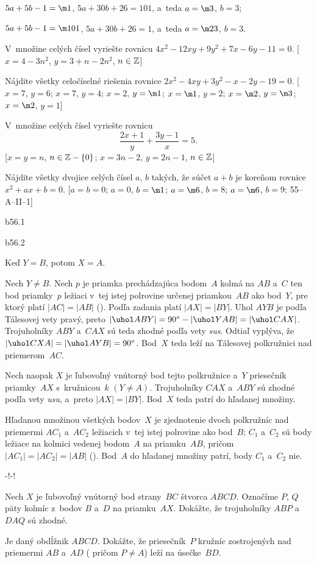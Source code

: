 {$5a+5b-1=\m1$, $5a+30b+26=101$, a~teda $a=\m3$, $b=3$;

$5a+5b-1=\m101$, $5a+30b+26=1$, a~teda $a=\m23$, $b=3$.

V~množine celých čísel vyriešte rovnicu $4x^2-12xy+9y^2+7x-6y-11=0$.
[$x=4-3n^2$, $y=3+n-2n^2$, $n\in\Bbb Z$]

Nájdite všetky celočíselné riešenia rovnice $2x^2-4xy+3y^2-x-2y-19=0$.
[$x=7$, $y=6$; $x=7$, $y=4$; $x=2$, $y=\m1$;  $x=\m1$, $y=2$; $x=\m2$, $y=\m3$; $x=\m2$, $y=1$]

V~množine celých čísel vyriešte rovnicu
$$
\frac {2x+1}y+\frac{3y-1}x=5.
$$
[$x=y=n$, $n\in\Bbb Z-\{0\}$; $x=3n-2$, $y=2n-1$, $n\in\Bbb Z$]

Nájdite všetky dvojice celých čísel $a$, $b$ takých, že súčet $a+b$ je koreňom rovnice $x^2+ax+b=0$.
[$a=b=0$; $a=0$, $b=\m1$; $a=\m6$, $b=8$; $a=\m6$, $b=9$; 55--A--II--1]

}

{%
\epsplace b56.1 \hfil\Obr \par
\epsplace b56.2 \hfil\Obr

Keď $Y=B$, potom $X=A$. 

Nech $Y\ne B$. Nech $p$ je priamka prechádzajúca bodom~$A$ kolmá na $AB$ a~$C$ ten bod priamky~$p$ ležiaci v~tej istej polrovine určenej priamkou~$AB$ ako bod~$Y$, pre ktorý platí $|AC|=|AB|$ (\obr). Podľa zadania platí $|AX|=|BY|$. Uhol $AYB$ je podľa Tálesovej vety pravý, preto $|\uhol ABY|=90^\circ -|\uhol YAB|=|\uhol CAX|$. Trojuholníky $ABY$ a~$CAX$ sú teda zhodné podľa vety {\it sus}. Odtiaľ vyplýva, že $|\uhol CXA|=|\uhol AYB|=90^\circ$. Bod~$X$ teda leží na Tálesovej polkružnici nad priemerom~$AC$.

Nech naopak $X$ je ľubovoľný vnútorný bod tejto polkružnice a~$Y$ priesečník priamky~$AX$ s~kružnicou~$k$ $(Y\ne A)$. Trojuholníky $CAX$ a~$ABY$ sú zhodné podľa vety {\it usu}, a~preto $|AX|=|BY|$. Bod~$X$ teda patrí do hľadanej množiny.

Hľadanou množinou všetkých bodov~$X$ je zjednotenie dvoch polkružníc nad priemermi $AC_1$ a~$AC_2$ ležiacich v~tej istej polrovine ako bod~$B$; $C_1$ a~$C_2$ sú body ležiace na kolmici vedenej bodom~$A$ na priamku~$AB$, pričom $|AC_1|=|AC_2|=|AB|$ (\obr). Bod~$A$ do hľadanej množiny patrí, body $C_1$ a~$C_2$ nie.

\midinsert
\centerline{\inspicture-!\hss\inspicture-!}
\endinsert

Nech $X$ je ľubovoľný vnútorný bod strany~$BC$ štvorca $ABCD$. Označíme $P$, $Q$ päty kolmíc z~bodov $B$ a~$D$ na priamku~$AX$. Dokážte, že trojuholníky $ABP$ a~$DAQ$ sú zhodné.

Je daný obdĺžnik $ABCD$. Dokážte, že priesečník~$P$ kružníc zostrojených nad priemermi $AB$ a~$AD$ ( pričom $P \ne A$) leží na úsečke~$BD$.

}

